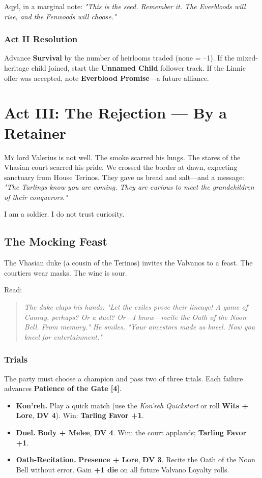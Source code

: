\documentclass[11pt]{book}
\begin{document}
Aqyl, in a marginal note: \emph{"This is the seed. Remember it. The Everbloods will rise, and the Fenwoods will choose."}

\subsection*{Act II Resolution}
Advance \textbf{Survival} by the number of heirlooms traded (none = --1). If the mixed-heritage child joined, start the \textbf{Unnamed Child} follower track. If the Linnic offer was accepted, note \textbf{Everblood Promise}---a future alliance.

\clearpage

\chapter{Act III: The Rejection --- By a Retainer}

\lettrine{M}{y} lord Valerius is not well. The smoke scarred his lungs. The stares of the Vhasian court scarred his pride. We crossed the border at dawn, expecting sanctuary from House Terinos. They gave us bread and salt---and a message: \textit{"The Tarlings know you are coming. They are curious to meet the grandchildren of their conquerors."}

I am a soldier. I do not trust curiosity.

\section*{The Mocking Feast}
The Vhasian duke (a cousin of the Terinos) invites the Valvanos to a feast. The courtiers wear masks. The wine is sour.

Read:
\begin{quote}
\emph{The duke claps his hands. "Let the exiles prove their lineage! A game of Canray, perhaps? Or a duel? Or---I know---recite the Oath of the Noon Bell. From memory." He smiles. "Your ancestors made us kneel. Now you kneel for entertainment."}
\end{quote}

\subsection*{Trials}
The party must choose a champion and pass two of three trials. Each failure advances \textbf{Patience of the Gate [4]}.
\begin{itemize}
    \item \textbf{Kon'reh.} Play a quick match (use the \textit{Kon'reh Quickstart} or roll \textbf{Wits + Lore}, \textbf{DV 4}). Win: \textbf{Tarling Favor +1}.
    \item \textbf{Duel.} \textbf{Body + Melee}, \textbf{DV 4}. Win: the court applauds; \textbf{Tarling Favor +1}.
    \item \textbf{Oath-Recitation.} \textbf{Presence + Lore}, \textbf{DV 3}. Recite the Oath of the Noon Bell without error. Gain \textbf{+1 die} on all future Valvano Loyalty rolls.
\end{itemize}
\end{document}
